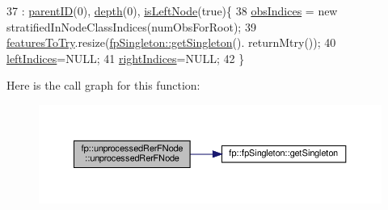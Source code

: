 \begin{DoxyCode}
37                                                       :  \hyperlink{classfp_1_1unprocessedRerFNode_ab87cfcf5df700dbc7ec02c87057b27aa}{parentID}(0), 
      \hyperlink{classfp_1_1unprocessedRerFNode_ad54ee9ea4003179b8304afb4f20d3a84}{depth}(0), \hyperlink{classfp_1_1unprocessedRerFNode_a75fe4b426a6a1cc8bb1de50380dcec94}{isLeftNode}(\textcolor{keyword}{true})\{
38                     \hyperlink{classfp_1_1unprocessedRerFNode_ad52d9d508bf378bc793b8cf961163735}{obsIndices} = \textcolor{keyword}{new} stratifiedInNodeClassIndices(numObsForRoot);
39                     \hyperlink{classfp_1_1unprocessedRerFNode_aa2028578f341c8f41cf000eb40d228f2}{featuresToTry}.resize(\hyperlink{classfp_1_1fpSingleton_a8bdae77b68521003e3fc630edec2e240}{fpSingleton::getSingleton}().
      returnMtry());
40                     \hyperlink{classfp_1_1unprocessedRerFNode_ae402805c487d29fa6d0b8fb6f873a4d3}{leftIndices}=NULL;
41                     \hyperlink{classfp_1_1unprocessedRerFNode_a4cc97ffcfe51937766fed926bbc4892a}{rightIndices}=NULL;
42                 \}
\end{DoxyCode}
Here is the call graph for this function\+:
\nopagebreak
\begin{figure}[H]
\begin{center}
\leavevmode
\includegraphics[width=350pt]{classfp_1_1unprocessedRerFNode_a49970c4650bc7c448e29d6efd0dcfd34_cgraph}
\end{center}
\end{figure}
\mbox{\label{classfp_1_1unprocessedRerFNode_ab20dcd6c9729051144ac3013c7c8fd5d}} 
